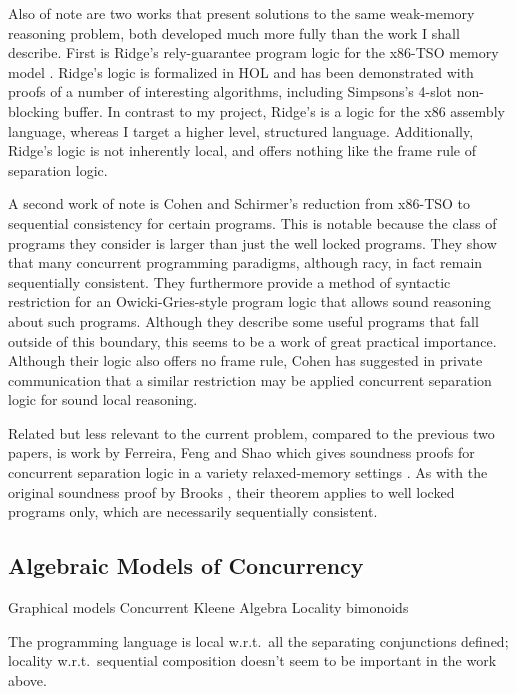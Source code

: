 \documentclass[11pt]{article}
\begin{document}
Also of note are two works that present solutions to the same weak-memory reasoning problem, both developed much more fully than the work I shall describe. First is Ridge's rely-guarantee program logic for the x86-TSO memory model \cite{DBLP:conf/vstte/Ridge10}. Ridge's logic is formalized in HOL and has been demonstrated with proofs of a number of interesting algorithms, including Simpsons's 4-slot non-blocking buffer. In contrast to my project, Ridge's is a logic for the x86 assembly language, whereas I target a higher level, structured language. Additionally, Ridge's logic is not inherently local, and offers nothing like the frame rule of separation logic. 

A second work of note is Cohen and Schirmer's \cite{DBLP:conf/itp/CohenS10} reduction from x86-TSO to sequential consistency for certain programs. This is notable because the class of programs they consider is larger than just the well locked programs. They show that many concurrent programming paradigms, although racy, in fact remain sequentially consistent. They furthermore provide a method of syntactic restriction for an Owicki-Gries-style program logic that allows sound reasoning about such programs. Although they describe some useful programs that fall outside of this boundary, this seems to be a work of great practical importance. Although their logic also offers no frame rule, Cohen has suggested in private communication that a similar restriction may be applied concurrent separation logic for sound local reasoning.

Related but less relevant to the current problem, compared to the previous two papers, is work by Ferreira, Feng and Shao which gives soundness proofs for concurrent separation logic in a variety relaxed-memory settings \cite{DBLP:conf/esop/FerreiraFS10}. As with the original soundness proof by Brooks \cite{DBLP:journals/tcs/Brookes07}, their theorem applies to well locked programs only, which are necessarily sequentially consistent. 

\subsection{Algebraic Models of Concurrency}

Graphical models \cite{DBLP:journals/ipl/WehrmanHO09} Concurrent Kleene Algebra \cite{DBLP:conf/RelMiCS/HoareMSW09,DBLP:conf/concur/HoareMSW09} Locality bimonoids \cite{DBLP:conf/concur/HoareHMOPS11} 

The programming language is local w.r.t.\ all the separating conjunctions defined; locality w.r.t.\ sequential composition doesn't seem to be important in the work above.  
\end{document}
